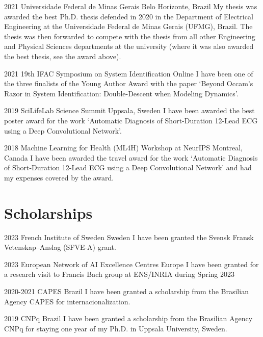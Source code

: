 \documentclass[10pt,letterpaper]{article} %
\begin{document}
    { 2021 }
    { Universidade Federal de Minas Gerais }
    { Belo Horizonte, Brazil }
    { My thesis was awarded the best Ph.D. thesis defended in 2020 in the Department of Electrical Engineering at the Universidade Federal de Minas Gerais (UFMG), Brazil. The thesis was then forwarded to compete with the thesis from all other Engineering and Physical Sciences departments at the university (where it was also awarded the best thesis, see the award above). }

    { 2021 }
    { 19th IFAC Symposium on System Identification }
    { Online }
    { I have been one of the three finalists of the Young Author Award with the paper `Beyond Occam’s Razor in System Identification:  Double-Descent when Modeling Dynamics'. }

    { 2019 }
    { SciLifeLab Science Summit }
    { Uppsala, Sweden }
    { I have been awarded the best poster award for the work `Automatic Diagnosis of Short-Duration 12-Lead ECG using a Deep Convolutional Network'. }

    { 2018 }
    { Machine Learning for Health (ML4H) Workshop at NeurIPS }
    { Montreal, Canada }
    { I have been awarded the travel award for the work `Automatic Diagnosis of Short-Duration 12-Lead ECG using a Deep Convolutional Network' and had my expenses covered by the award. }


\section*{Scholarships}


    { 2023 }
    { French Institute of Sweden }
    { Sweden }
    { I have been granted the Svensk Fransk Vetenskap–Anslag (SFVE-A) grant. }

    { 2023 }
    { European Network of AI Excellence Centres }
    { Europe }
    { I have been granted for a research visit to Francis Bach group at ENS/INRIA during Spring 2023 }

    { 2020-2021 }
    { CAPES }
    { Brazil }
    { I have been granted a scholarship from the Brasilian Agency CAPES for internacionalization. }

    { 2019 }
    { CNPq }
    { Brazil }
    { I have been granted a scholarship from the Brasilian Agency CNPq for staying one year of my Ph.D. in Uppsala University, Sweden. }
\end{document}
